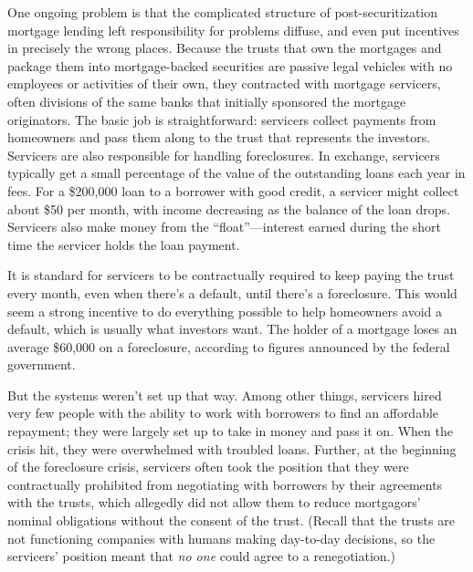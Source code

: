 One ongoing problem is that the complicated structure of post-securitization
mortgage lending left responsibility for problems diffuse, and even put
incentives in precisely the wrong places.  Because the trusts that own the
mortgages and package them into mortgage-backed securities are passive legal
vehicles with no employees or activities of their own, they contracted with
mortgage servicers, often divisions of the same banks that initially sponsored
the mortgage originators.  The basic job is straightforward: servicers collect
payments from homeowners and pass them along to the trust that represents the
investors. Servicers are also responsible for handling foreclosures. In
exchange, servicers typically get a small percentage of the value of the
outstanding loans each year in fees.  For a \$200,000 loan to a borrower with
good credit, a servicer might collect about \$50 per month, with income
decreasing as the balance of the loan drops. Servicers also make money from the
``float''---interest earned during the short time the servicer holds the
loan payment.

It is standard for servicers to be contractually required to keep paying the
trust every month, even when there's a default, until there's a foreclosure. 
This would seem a strong incentive to do everything possible to help homeowners
avoid a default, which is usually what investors want. The holder of a mortgage
loses an average \$60,000 on a foreclosure, according to figures announced by
the federal government. 

But the systems weren't set up that way.  Among other things, servicers hired
very few people with the ability to work with borrowers to find an affordable
repayment; they were largely set up to take in money and pass it on.  When the
crisis hit, they were overwhelmed with troubled loans.  Further, at the
beginning of the foreclosure crisis, servicers often took the position that
they were contractually prohibited from negotiating with borrowers by their
agreements with the trusts, which allegedly did not allow them to reduce
mortgagors' nominal obligations without the consent of the trust.  (Recall that
the trusts are not functioning companies with humans making day-to-day
decisions, so the servicers' position meant that \textit{no one} could agree to
a renegotiation.)


